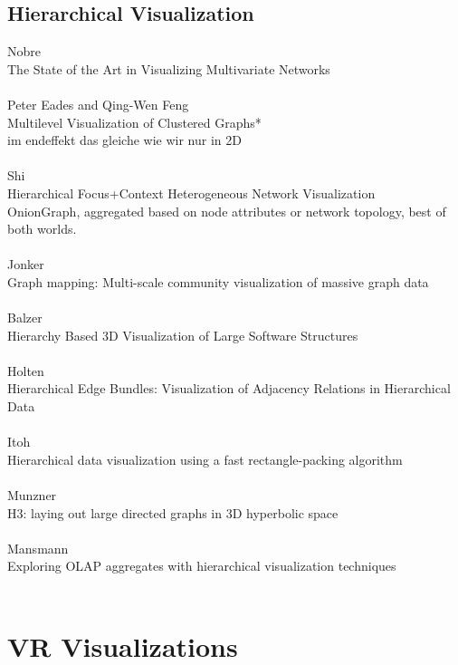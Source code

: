 \subsection{Hierarchical Visualization}
Nobre\\
The State of the Art in Visualizing Multivariate Networks\\
\\
Peter Eades and Qing-Wen Feng\\
Multilevel Visualization of Clustered Graphs*\\
im endeffekt das gleiche wie wir nur in 2D\\
\\
Shi\\
Hierarchical Focus+Context Heterogeneous Network Visualization\\
OnionGraph, aggregated based on node attributes or network topology,
best of both worlds.\\
\\
Jonker\\
Graph mapping: Multi-scale community visualization of massive graph data\\
\\
Balzer\\
Hierarchy Based 3D Visualization of Large Software Structures\\
\\
Holten\\
Hierarchical Edge Bundles: Visualization of Adjacency Relations in Hierarchical Data\\
\\
Itoh\\
Hierarchical data visualization using a fast rectangle-packing algorithm\\
\\
Munzner\\
H3: laying out large directed graphs in 3D hyperbolic space\\
\\
Mansmann\\
Exploring OLAP aggregates with hierarchical visualization techniques\\
\\

\section{VR Visualizations}


